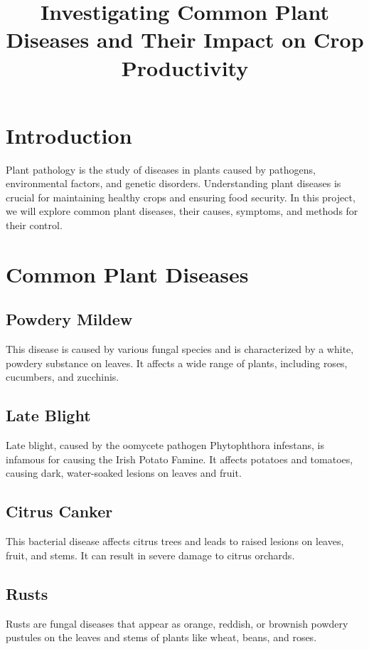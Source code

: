 \documentclass[11pt]{article}
\title{Investigating Common Plant Diseases and Their Impact on Crop Productivity}
\begin{document}
\maketitle
\tableofcontents
\newpage
\section{ Introduction}
Plant pathology is the study of diseases in plants caused by pathogens, environmental factors, and genetic disorders. Understanding plant diseases is crucial for maintaining healthy crops and ensuring food security. In this project, we will explore common plant diseases, their causes, symptoms, and methods for their control.

\section{Common Plant Diseases}

    \subsection{Powdery Mildew} This disease is caused by various fungal species and is characterized by a white, powdery substance on leaves. It affects a wide range of plants, including roses, cucumbers, and zucchinis.

    \subsection{Late Blight} Late blight, caused by the oomycete pathogen Phytophthora infestans, is infamous for causing the Irish Potato Famine. It affects potatoes and tomatoes, causing dark, water-soaked lesions on leaves and fruit.

   \subsection{ Citrus Canker} This bacterial disease affects citrus trees and leads to raised lesions on leaves, fruit, and stems. It can result in severe damage to citrus orchards.

    \subsection{Rusts} Rusts are fungal diseases that appear as orange, reddish, or brownish powdery pustules on the leaves and stems of plants like wheat, beans, and roses.
\end{document}
